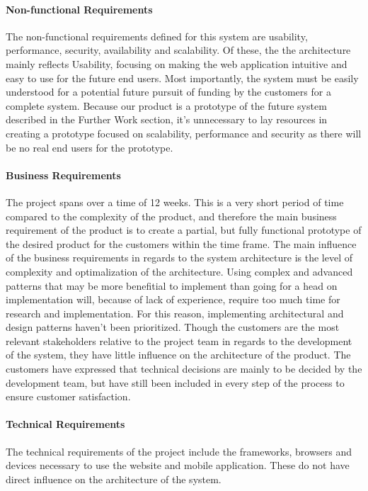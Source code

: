 \paragraph{Non-functional Requirements}
The non-functional requirements defined for this system are usability, performance, security, availability and scalability. Of these, the the architecture mainly reflects Usability, focusing on making the web application intuitive and easy to use for the future end users. Most importantly, the system must be easily understood for a potential future pursuit of funding by the customers for a complete system. Because our product is a prototype of the future system described in the Further Work section, it's unnecessary to lay resources in creating a prototype focused on scalability, performance and security as there will be no real end users for the prototype. 

\paragraph{Business Requirements}
The project spans over a time of 12 weeks. This is a very short period of time compared to the complexity of the product, and therefore the main business requirement of the product is to create a partial, but fully functional prototype of the desired product for the customers within the time frame. The main influence of the business requirements in regards to the system architecture is the level of complexity and optimalization of the architecture. Using complex and advanced patterns that may be more benefitial to implement than going for a head on implementation will, because of lack of experience, require too much time for research and implementation. For this reason, implementing architectural and design patterns haven't been prioritized. Though the customers are the most relevant stakeholders relative to the project team in regards to the development of the system, they have little influence on the architecture of the product. The customers have expressed that technical decisions are mainly to be decided by the development team, but have still been included in every step of the process to ensure customer satisfaction. 

\paragraph{Technical Requirements}
The technical requirements of the project include the frameworks, browsers and devices necessary to use the website and mobile application. These do not have direct influence on the architecture of the system. 


